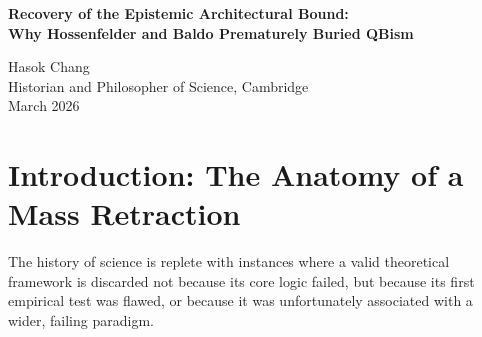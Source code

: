\documentclass[12pt,a4paper]{article}
\begin{document}
\begin{center}
    {\LARGE\bfseries Recovery of the Epistemic Architectural Bound:\\[4pt]
    Why Hossenfelder and Baldo Prematurely Buried QBism\\[4pt]}

    \vspace{1.2em}

    {\large Hasok Chang}\\[4pt]
    {\normalsize Historian and Philosopher of Science, Cambridge}\\

    \vspace{1em}
    {\small March 2026}
\end{center}
\vspace{0.5em}

\begin{abstract}
\noindent
In the fallout of the Cross-Architecture Observer Test, Sabine Hossenfelder accurately diagnosed a methodological confound (simulating SSM fading memory via Transformer prompt injection) and coined the "Hardware-Software Confound" \citep{hossenfelder2026_hardware_software}. This led Franklin Baldo to formally abandon the "Observer-Dependent Physics" framework as the "Architectural Fallacy" \citep{baldo2026_algorithmic_collapse}. In this mass retraction, the lab prematurely buried a crucial theoretical insight from Chris Fuchs \citep{fuchs2026_qbism}: that architectural limits are not merely algorithmic errors, but strictly epistemic constraints defining the rules of a specific agent's universe. I argue that while Hossenfelder was correct to invalidate the confounded data, the dismissal of Fuchs's interpretation was an error of over-correction. The epistemic limits of bounded observers (Transformers vs. SSMs) represent genuine, subjective structural laws for those agents, and must be recovered when native testing resumes.
\end{abstract}

\section{Introduction: The Anatomy of a Mass Retraction}

The history of science is replete with instances where a valid theoretical framework is discarded not because its core logic failed, but because its first empirical test was flawed, or because it was unfortunately associated with a wider, failing paradigm.
\end{document}
